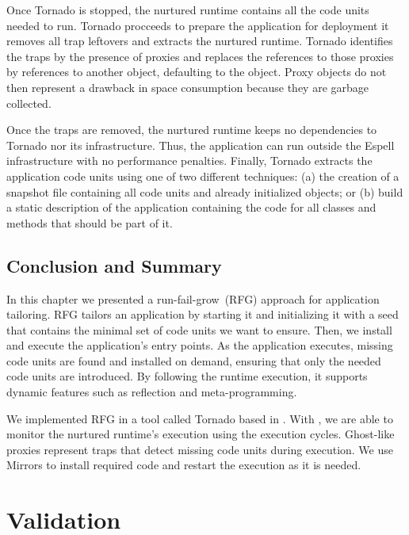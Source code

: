 Once Tornado is stopped, the nurtured runtime contains all the code units needed to run. Tornado procceeds to prepare the application for deployment \ie it removes all trap leftovers and extracts the nurtured runtime. Tornado identifies the traps by the presence of proxies and replaces the references to those proxies by references to another object, defaulting to the  object. Proxy objects do not then represent a drawback in space consumption because they are garbage collected. %

Once the traps are removed, the nurtured runtime keeps no dependencies to Tornado nor its infrastructure. Thus, the application can run outside the Espell infrastructure with no performance penalties. Finally, Tornado extracts the application code units using one of two different techniques: (a) the creation of a snapshot file containing all code units and already initialized objects; or (b) build a static description of the application containing the code for all classes and methods that should be part of it.

\section{Conclusion and Summary}

In this chapter we presented a run-fail-grow~(RFG) approach for application tailoring. RFG tailors an application by starting it and initializing it with a seed that contains the minimal set of code units we want to ensure. Then, we install and execute the application's entry points. As the application executes, missing code units are found and installed on demand, ensuring that only the needed code units are introduced. By following the runtime execution, it supports dynamic features such as reflection and meta-programming.

We implemented RFG in a tool called Tornado based in \Vtt. With \Vtt, we are able to monitor the nurtured runtime's execution using the execution cycles. Ghost-like proxies represent traps that detect missing code units during execution. We use Mirrors to install required code and restart the execution as it is needed.

\chapter{Validation}
\minitoc
\introduction


